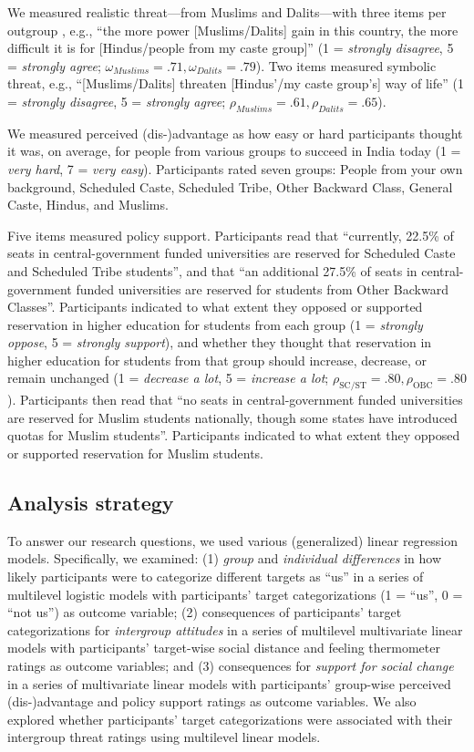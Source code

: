 \documentclass[12pt, a4paper]{article}
\begin{document}
We measured realistic threat---from Muslims and Dalits---with three items per outgroup \parencite{schmid_reducing_2014}, e.g., “the more power [Muslims/Dalits] gain in this country, the more difficult it is for [Hindus/people from my caste group]” (1 = \textit{strongly disagree}, 5 = \textit{strongly agree}; $\omega_\textit{Muslims} = .71, \omega_\textit{Dalits} = .79$). Two items measured symbolic threat, e.g., “[Muslims/Dalits] threaten [Hindus’/my caste group’s] way of life” (1 = \textit{strongly disagree}, 5 = \textit{strongly agree}; $\rho_\textit{Muslims} = .61, \rho_\textit{Dalits} = .65$).

We measured perceived (dis-)advantage as how easy or hard participants thought it was, on average, for people from various groups to succeed in India today (1 = \textit{very hard}, 7 = \textit{very easy}). Participants rated seven groups: People from your own background, Scheduled Caste, Scheduled Tribe, Other Backward Class, General Caste, Hindus, and Muslims.

Five items measured policy support. Participants read that “currently, 22.5\% of seats in central-government funded universities are reserved for Scheduled Caste and Scheduled Tribe students”, and that “an additional 27.5\% of seats in central-government funded universities are reserved for students from Other Backward Classes”. Participants indicated to what extent they opposed or supported reservation in higher education for students from each group (1 = \textit{strongly oppose}, 5 = \textit{strongly support}), and whether they thought that reservation in higher education for students from that group should increase, decrease, or remain unchanged (1 = \textit{decrease a lot}, 5 = \textit{increase a lot}; $\rho_\text{SC/ST} = .80, \rho_\text{OBC} = .80$). Participants then read that “no seats in central-government funded universities are reserved for Muslim students nationally, though some states have introduced quotas for Muslim students”. Participants indicated to what extent they opposed or supported reservation for Muslim students.

\subsection{Analysis strategy}

To answer our research questions, we used various (generalized) linear regression models. Specifically, we examined: (1) \emph{group} and \emph{individual differences} in how likely participants were to categorize different targets as “us” in a series of multilevel logistic models with participants’ target categorizations (1 = “us”, 0 = “not us”) as outcome variable; (2) consequences of participants’ target categorizations for \emph{intergroup attitudes} in a series of multilevel multivariate linear models with participants’ target-wise social distance and feeling thermometer ratings as outcome variables; and (3) consequences for \emph{support for social change} in a series of multivariate linear models with participants’ group-wise perceived (dis-)advantage and policy support ratings as outcome variables. We also explored whether participants’ target categorizations were associated with their intergroup threat ratings using multilevel linear models.
\end{document}

